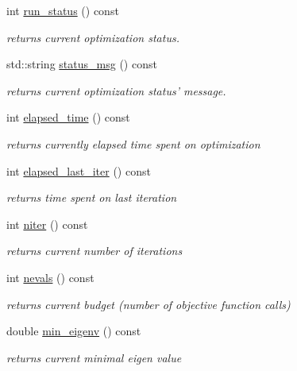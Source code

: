 \begin{DoxyCompactItemize}
int \hyperlink{classlibcmaes_1_1CMASolutions_a4215c5baf357d23ef893eb52b4766eea}{run\-\_\-status} () const 
\begin{DoxyCompactList}\small\item\em returns current optimization status. \end{DoxyCompactList}\item 
std\-::string \hyperlink{classlibcmaes_1_1CMASolutions_a2a255d59c7e139109781cef8f5d94c38}{status\-\_\-msg} () const 
\begin{DoxyCompactList}\small\item\em returns current optimization status' message. \end{DoxyCompactList}\item 
int \hyperlink{classlibcmaes_1_1CMASolutions_add680b4437a6a2786b7a6228fa73023e}{elapsed\-\_\-time} () const 
\begin{DoxyCompactList}\small\item\em returns currently elapsed time spent on optimization \end{DoxyCompactList}\item 
int \hyperlink{classlibcmaes_1_1CMASolutions_a5b6c88e6f490f9135bd0795ee9062f4a}{elapsed\-\_\-last\-\_\-iter} () const 
\begin{DoxyCompactList}\small\item\em returns time spent on last iteration \end{DoxyCompactList}\item 
int \hyperlink{classlibcmaes_1_1CMASolutions_aceb58df5ee91f159e626b51ee788c381}{niter} () const 
\begin{DoxyCompactList}\small\item\em returns current number of iterations \end{DoxyCompactList}\item 
int \hyperlink{classlibcmaes_1_1CMASolutions_a225f3f00557469d3cf7567d0dd301fc0}{nevals} () const 
\begin{DoxyCompactList}\small\item\em returns current budget (number of objective function calls) \end{DoxyCompactList}\item 
double \hyperlink{classlibcmaes_1_1CMASolutions_af0b9acecd0f092ce781d4bb1119f5844}{min\-\_\-eigenv} () const 
\begin{DoxyCompactList}\small\item\em returns current minimal eigen value \end{DoxyCompactList}\item 

\end{DoxyCompactItemize}
